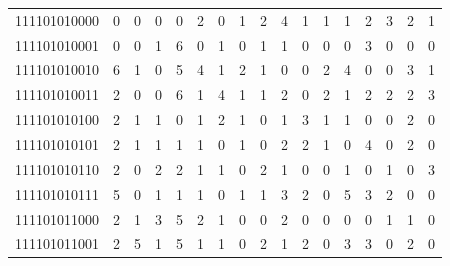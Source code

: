 \documentclass[10pt,a4paper]{article}
\begin{document}
\begin{longtable}{ |c|c|c|c|c|c|c|c|c|c|c|c|c|c|c|c|c| }
    111101010000              & 0                            & 0                                & 0                            & 0                              & 2   & 0   & 1   & 2   & 4   & 1   & 1   & 1   & 2   & 3   & 2   & 1   \\
    111101010001              & 0                            & 0                                & 1                            & 6                              & 0   & 1   & 0   & 1   & 1   & 0   & 0   & 0   & 3   & 0   & 0   & 0   \\
    111101010010              & 6                            & 1                                & 0                            & 5                              & 4   & 1   & 2   & 1   & 0   & 0   & 2   & 4   & 0   & 0   & 3   & 1   \\
    111101010011              & 2                            & 0                                & 0                            & 6                              & 1   & 4   & 1   & 1   & 2   & 0   & 2   & 1   & 2   & 2   & 2   & 3   \\
    111101010100              & 2                            & 1                                & 1                            & 0                              & 1   & 2   & 1   & 0   & 1   & 3   & 1   & 1   & 0   & 0   & 2   & 0   \\
    111101010101              & 2                            & 1                                & 1                            & 1                              & 1   & 0   & 1   & 0   & 2   & 2   & 1   & 0   & 4   & 0   & 2   & 0   \\
    111101010110              & 2                            & 0                                & 2                            & 2                              & 1   & 1   & 0   & 2   & 1   & 0   & 0   & 1   & 0   & 1   & 0   & 3   \\
    111101010111              & 5                            & 0                                & 1                            & 1                              & 1   & 0   & 1   & 1   & 3   & 2   & 0   & 5   & 3   & 2   & 0   & 0   \\
    111101011000              & 2                            & 1                                & 3                            & 5                              & 2   & 1   & 0   & 0   & 2   & 0   & 0   & 0   & 0   & 1   & 1   & 0   \\
    111101011001              & 2                            & 5                                & 1                            & 5                              & 1   & 1   & 0   & 2   & 1   & 2   & 0   & 3   & 3   & 0   & 2   & 0   \\

\end{longtable}
\end{document}
